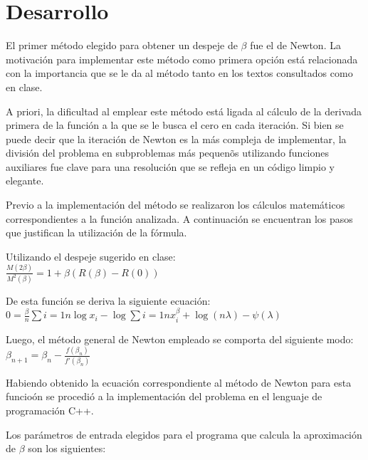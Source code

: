 \section{Desarrollo}
El primer m\'etodo elegido para obtener un despeje de $\beta$ fue el de Newton. La motivaci\'on para implementar este m\'etodo como primera opci\'on est\'a relacionada con la importancia que se le da al m\'etodo tanto en los textos consultados como en clase. 

A priori, la dificultad al emplear este m\'etodo est\'a ligada al c\'alculo de la derivada primera de la funci\'on a la que se le busca el cero en cada iteraci\'on. Si bien se puede decir que la iteraci\'on de Newton es la m\'as compleja de implementar, la divisi\'on del problema en subproblemas m\'as pequen\~os utilizando funciones auxiliares fue clave para una resoluci\'on que se refleja en un c\'odigo limpio y elegante.


Previo a la implementaci\'on del m\'etodo se realizaron los c\'alculos matem\'aticos correspondientes a la funci\'on analizada. A continuaci\'on se encuentran los pasos que justifican la utilizaci\'on de la f\'ormula.

Utilizando el despeje sugerido en clase:\\

$\frac{M(2\beta)}{M^2(\beta)}=1 + \beta(R(\beta)-R(0))$

De esta funci\'on se deriva la siguiente ecuaci\'on: \\

$0 = \frac{\beta}{n}\sum{i=1}{n}\log x_i - \log \sum{i=1}{n}x_i^{\beta} + \log(n\lambda)-\psi(\lambda)$

Luego, el m\'etodo general de Newton empleado se comporta del siguiente modo: \\

$\beta_{n+1} = \beta_{n} - \frac{f(\beta_{n})}{f'(\beta_{n})}$

Habiendo obtenido la ecuaci\'on correspondiente al m\'etodo de Newton para esta funcio\'on se procedi\'o a la implementaci\'on del problema en el lenguaje de programaci\'on C++.

Los par\'ametros de entrada elegidos para el programa que calcula la aproximaci\'on de $\beta$ son los siguientes:

